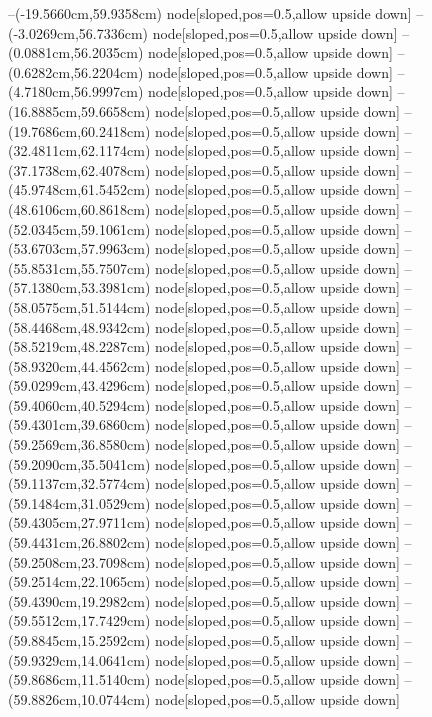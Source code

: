 --(-19.5660cm,59.9358cm) node[sloped,pos=0.5,allow upside down]{\ArrowIn}
--(-3.0269cm,56.7336cm) node[sloped,pos=0.5,allow upside down]{\ArrowIn}
--(0.0881cm,56.2035cm) node[sloped,pos=0.5,allow upside down]{\ArrowIn}
--(0.6282cm,56.2204cm) node[sloped,pos=0.5,allow upside down]{\arrowIn}
--(4.7180cm,56.9997cm) node[sloped,pos=0.5,allow upside down]{\ArrowIn}
--(16.8885cm,59.6658cm) node[sloped,pos=0.5,allow upside down]{\ArrowIn}
--(19.7686cm,60.2418cm) node[sloped,pos=0.5,allow upside down]{\ArrowIn}
--(32.4811cm,62.1174cm) node[sloped,pos=0.5,allow upside down]{\ArrowIn}
--(37.1738cm,62.4078cm) node[sloped,pos=0.5,allow upside down]{\ArrowIn}
--(45.9748cm,61.5452cm) node[sloped,pos=0.5,allow upside down]{\ArrowIn}
--(48.6106cm,60.8618cm) node[sloped,pos=0.5,allow upside down]{\ArrowIn}
--(52.0345cm,59.1061cm) node[sloped,pos=0.5,allow upside down]{\ArrowIn}
--(53.6703cm,57.9963cm) node[sloped,pos=0.5,allow upside down]{\ArrowIn}
--(55.8531cm,55.7507cm) node[sloped,pos=0.5,allow upside down]{\ArrowIn}
--(57.1380cm,53.3981cm) node[sloped,pos=0.5,allow upside down]{\ArrowIn}
--(58.0575cm,51.5144cm) node[sloped,pos=0.5,allow upside down]{\ArrowIn}
--(58.4468cm,48.9342cm) node[sloped,pos=0.5,allow upside down]{\ArrowIn}
--(58.5219cm,48.2287cm) node[sloped,pos=0.5,allow upside down]{\arrowIn}
--(58.9320cm,44.4562cm) node[sloped,pos=0.5,allow upside down]{\ArrowIn}
--(59.0299cm,43.4296cm) node[sloped,pos=0.5,allow upside down]{\ArrowIn}
--(59.4060cm,40.5294cm) node[sloped,pos=0.5,allow upside down]{\ArrowIn}
--(59.4301cm,39.6860cm) node[sloped,pos=0.5,allow upside down]{\arrowIn}
--(59.2569cm,36.8580cm) node[sloped,pos=0.5,allow upside down]{\ArrowIn}
--(59.2090cm,35.5041cm) node[sloped,pos=0.5,allow upside down]{\ArrowIn}
--(59.1137cm,32.5774cm) node[sloped,pos=0.5,allow upside down]{\ArrowIn}
--(59.1484cm,31.0529cm) node[sloped,pos=0.5,allow upside down]{\ArrowIn}
--(59.4305cm,27.9711cm) node[sloped,pos=0.5,allow upside down]{\ArrowIn}
--(59.4431cm,26.8802cm) node[sloped,pos=0.5,allow upside down]{\ArrowIn}
--(59.2508cm,23.7098cm) node[sloped,pos=0.5,allow upside down]{\ArrowIn}
--(59.2514cm,22.1065cm) node[sloped,pos=0.5,allow upside down]{\ArrowIn}
--(59.4390cm,19.2982cm) node[sloped,pos=0.5,allow upside down]{\ArrowIn}
--(59.5512cm,17.7429cm) node[sloped,pos=0.5,allow upside down]{\ArrowIn}
--(59.8845cm,15.2592cm) node[sloped,pos=0.5,allow upside down]{\ArrowIn}
--(59.9329cm,14.0641cm) node[sloped,pos=0.5,allow upside down]{\ArrowIn}
--(59.8686cm,11.5140cm) node[sloped,pos=0.5,allow upside down]{\ArrowIn}
--(59.8826cm,10.0744cm) node[sloped,pos=0.5,allow upside down]{\ArrowIn}
